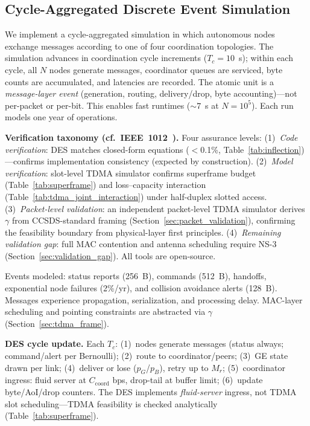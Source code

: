 \documentclass[journal]{IEEEtran}
\begin{document}
\subsection{Cycle-Aggregated Discrete Event Simulation}
\label{sec:des_architecture}

We implement a cycle-aggregated simulation in which autonomous nodes exchange messages according to one of four coordination topologies. The simulation advances in coordination cycle increments ($T_c = 10$~s); within each cycle, all $N$ nodes generate messages, coordinator queues are serviced, byte counts are accumulated, and latencies are recorded. The atomic unit is a \emph{message-layer event} (generation, routing, delivery/drop, byte accounting)---not per-packet or per-bit. This enables fast runtimes (${\sim}7$~s at $N = 10^5$). Each run models one year of operations.

\textbf{Verification taxonomy (cf.\ IEEE~1012~\cite{ieee_1012}).} Four assurance levels: (1)~\emph{Code verification}: DES matches closed-form equations ($<$0.1\%, Table~\ref{tab:inflection})---confirms implementation consistency (expected by construction). (2)~\emph{Model verification}: slot-level TDMA simulator confirms superframe budget (Table~\ref{tab:superframe}) and loss--capacity interaction (Table~\ref{tab:tdma_joint_interaction}) under half-duplex slotted access. (3)~\emph{Packet-level validation}: an independent packet-level TDMA simulator derives $\gamma$ from CCSDS-standard framing (Section~\ref{sec:packet_validation}), confirming the feasibility boundary from physical-layer first principles. (4)~\emph{Remaining validation gap}: full MAC contention and antenna scheduling require NS-3 (Section~\ref{sec:validation_gap}). All tools are open-source.

Events modeled: status reports (256~B), commands (512~B), handoffs, exponential node failures (2\%/yr), and collision avoidance alerts (128~B). Messages experience propagation, serialization, and processing delay. MAC-layer scheduling and pointing constraints are abstracted via $\gamma$ (Section~\ref{sec:tdma_frame}).

\textbf{DES cycle update.} Each $T_c$: (1)~nodes generate messages (status always; command/alert per Bernoulli); (2)~route to coordinator/peers; (3)~GE state drawn per link; (4)~deliver or lose ($p_G$/$p_B$), retry up to $M_r$; (5)~coordinator ingress: fluid server at $C_{\text{coord}}$ bps, drop-tail at buffer limit; (6)~update byte/AoI/drop counters. The DES implements \emph{fluid-server} ingress, not TDMA slot scheduling---TDMA feasibility is checked analytically (Table~\ref{tab:superframe}).
\end{document}
